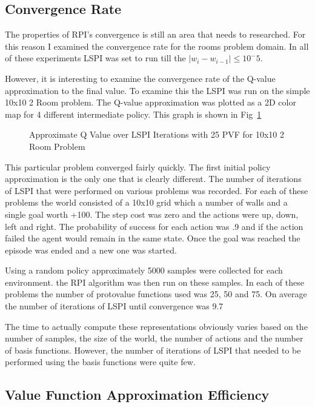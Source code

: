 \documentclass[12pt, letterpaper, final]{report}
\begin{document}
\subsection*{Convergence Rate}


The properties of RPI's convergence is still an area that needs to
researched. For this reason I examined the convergence rate for the
rooms problem domain. In all of these experiments
LSPI was set to run till the $|w_{i}-w_{i-1}| \le 10^-5$.

However, it is interesting to examine the convergence rate of the
Q-value approximation to the final value. To examine this the LSPI was
run on the simple 10x10 2 Room problem. The Q-value approximation was
plotted as a 2D color map for 4 different intermediate policy. This
graph is shown in Fig~\ref{Qconvergence1}

\FloatBarrier
\begin{figure}[h!]
\centering
\caption{Approximate Q Value over LSPI Iterations with 25 PVF for
  10x10 2 Room Problem}
\label{Qconvergence1}
\end{figure}
\FloatBarrier

This particular problem converged fairly quickly. The first initial
policy approximation is the only one that is clearly different. The
number of iterations of LSPI that were performed on various problems
was recorded. For each of these problems the world consisted of a
10x10 grid which a number of walls and a single goal worth +100. The
step cost was zero and the actions were up, down, left and right. The
probability of success for each action was .9 and if the action failed
the agent would remain in the same state. Once the goal was reached
the episode was ended and a new one was started.

Using a random policy approximately 5000 samples were collected for
each environment. the RPI algorithm was then run on these samples. In
each of these problems the number of protovalue functions used was 25,
50 and 75. On
average the number of iterations of LSPI until convergence was 9.7

The time to actually compute these representations obviously varies
based on the number of samples, the size of the world, the number of
actions and the number of basis functions. However, the number of
iterations of LSPI that needed to be performed using the basis
functions were quite few. 


\subsection*{Value Function Approximation Efficiency}
\end{document}
